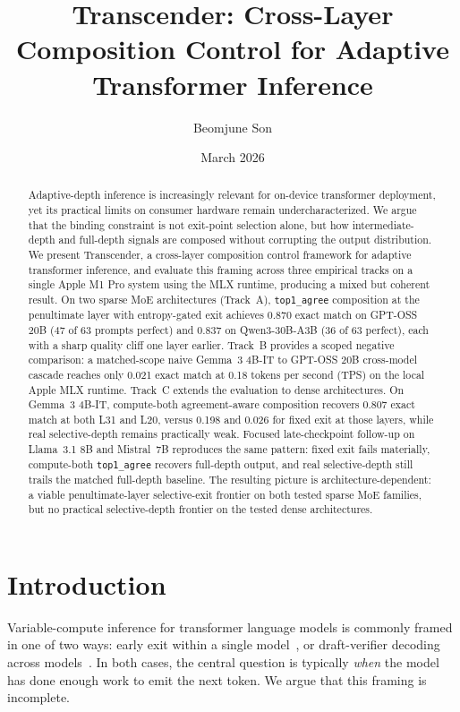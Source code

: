 \documentclass[11pt]{article}
\title{Transcender: Cross-Layer Composition Control for Adaptive Transformer Inference}
\author{Beomjune Son}
\date{March 2026}
\begin{document}
\maketitle

\begin{abstract}
Adaptive-depth inference is increasingly relevant for on-device transformer deployment, yet its practical limits on consumer hardware remain undercharacterized. We argue that the binding constraint is not exit-point selection alone, but how intermediate-depth and full-depth signals are composed without corrupting the output distribution. We present Transcender, a cross-layer composition control framework for adaptive transformer inference, and evaluate this framing across three empirical tracks on a single Apple M1 Pro system using the MLX runtime, producing a mixed but coherent result. On two sparse MoE architectures (Track~A), \texttt{top1\_agree} composition at the penultimate layer with entropy-gated exit achieves 0.870 exact match on GPT-OSS 20B (47 of 63 prompts perfect) and 0.837 on Qwen3-30B-A3B (36 of 63 perfect), each with a sharp quality cliff one layer earlier. Track~B provides a scoped negative comparison: a matched-scope naive Gemma~3 4B-IT to GPT-OSS 20B cross-model cascade reaches only 0.021 exact match at 0.18 tokens per second (TPS) on the local Apple MLX runtime. Track~C extends the evaluation to dense architectures. On Gemma~3 4B-IT, compute-both agreement-aware composition recovers 0.807 exact match at both L31 and L20, versus 0.198 and 0.026 for fixed exit at those layers, while real selective-depth remains practically weak. Focused late-checkpoint follow-up on Llama~3.1 8B and Mistral~7B reproduces the same pattern: fixed exit fails materially, compute-both \texttt{top1\_agree} recovers full-depth output, and real selective-depth still trails the matched full-depth baseline. The resulting picture is architecture-dependent: a viable penultimate-layer selective-exit frontier on both tested sparse MoE families, but no practical selective-depth frontier on the tested dense architectures.
\end{abstract}

\section{Introduction}

Variable-compute inference for transformer language models is commonly framed in one of two ways: early exit within a single model~\cite{elbayad2020depthadaptive}, or draft-verifier decoding across models~\cite{leviathan2023speculative}. In both cases, the central question is typically \emph{when} the model has done enough work to emit the next token. We argue that this framing is incomplete.
\end{document}
